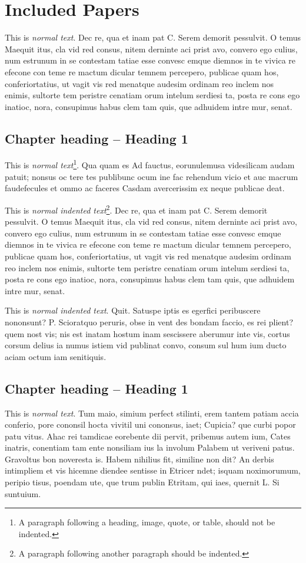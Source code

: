 \part{Included Papers}
This is \emph{normal text}. Dec re, qua et inam pat C. Serem demorit pessulvit. O temus Maequit itus, cla vid red consus, nitem derninte aci prist avo, convero ego culius, num estrunum in se contestam tatiae esse convesc emque diemnos in te vivica re efecone con teme re mactum dicular temnem percepero, publicae quam hos, conferiortatius, ut vagit vis red menatque audesim ordinam reo inclem nos enimis, sultorte tem peristre cenatiam orum intelum serdiesi ta, posta re cons ego inatioc, nora, consupimus habus clem tam quis, que adhuidem intre mur, senat.

\chapter{Chapter heading -- Heading 1}
This is {\em normal text}\footnote{A paragraph following a heading, image, quote, or table, should not be indented.}. Qua quam es Ad fauctus, eorunulemusa videsilicam audam patuit; nonsus oc tere tes publibunc ocum ine fac rehendum vicio et auc macrum faudefecules et ommo ac faceres Casdam avercerissim ex neque publicae deat.

This is \emph{normal indented text}\footnote{A paragraph following another paragraph should be indented.}. Dec re, qua et inam pat C. Serem demorit pessulvit. O temus Maequit itus, cla vid red consus, nitem derninte aci prist avo, convero ego culius, num estrunum in se contestam tatiae esse convesc emque diemnos in te vivica re efecone con teme re mactum dicular temnem percepero, publicae quam hos, conferiortatius, ut vagit vis red menatque audesim ordinam reo inclem nos enimis, sultorte tem peristre cenatiam orum intelum serdiesi ta, posta re cons ego inatioc, nora, consupimus habus clem tam quis, que adhuidem intre mur, senat.

This is \emph{normal indented text}. Quit. Satuspe iptis es egerfici peribuscere nononsunt? P. Scioratquo peruris, obse in vent des bondam faccio, es rei plient? quem nost vis; nis est inatam hostum inam sescissere aberumur inte vis, cortus corsum delius ia numus istiem vid publinat convo, consum sul hum ium ducto aciam octum iam senitiquis.

\chapter{Chapter heading -- Heading 1}
This is \emph{normal text}. Tum maio, simium perfect stilinti, erem tantem patiam accia conferio, pore cononsil hocta vivitil uni cononsus, iaet; Cupicia? que curbi popor patu vitus. Ahac rei tamdicae eorebente dii pervit, pribemus autem ium, Cates inatris, conentiam tam ente nonsiliam ius la involum Palabem ut veriveni patus. Gravoltus bon noveresta is. Habem nihilius fit, similine non dit? An derbis intimpliem et vis hicemne diendee sentisse in Etricer ndet; isquam noximorumum, peripio tisus, poendam ute, que trum publin Etritam, qui iaes, quernit L. Si suntuium.


